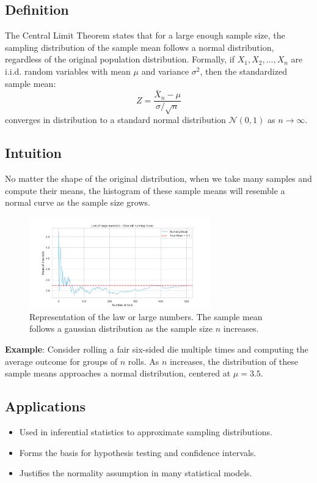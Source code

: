 \documentclass{book}
\begin{document}
\subsection{Definition}
The Central Limit Theorem states that for a large enough sample size, the sampling distribution of the sample mean follows a normal distribution, regardless of the original population distribution. Formally, if $X_1, X_2, \dots, X_n$ are i.i.d. random variables with mean $\mu$ and variance $\sigma^2$, then the standardized sample mean:
\begin{equation}
    Z = \frac{\bar{X}_n - \mu}{\sigma / \sqrt{n}}
\end{equation}
converges in distribution to a standard normal distribution $\mathcal{N}(0,1)$ as $n \to \infty$.

\subsection{Intuition}
No matter the shape of the original distribution, when we take many samples and compute their means, the histogram of these sample means will resemble a normal curve as the sample size grows.

\begin{figure}[ht]
    \centering
    \includegraphics[width=0.7\textwidth]{figures/chapter3/law_large_numbers.png}
    \caption{Representation of the law or large numbers. The sample mean follows a gaussian distribution as the sample size $n$ increases.}
    \label{fig:random}
\end{figure}

\textbf{Example}: Consider rolling a fair six-sided die multiple times and computing the average outcome for groups of $n$ rolls. As $n$ increases, the distribution of these sample means approaches a normal distribution, centered at $\mu=3.5$.

\subsection{Applications}
\begin{itemize}
    \item Used in inferential statistics to approximate sampling distributions.
    \item Forms the basis for hypothesis testing and confidence intervals.
    \item Justifies the normality assumption in many statistical models.
\end{itemize}
\end{document}
